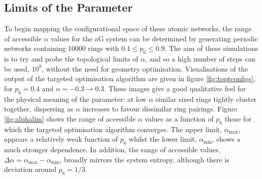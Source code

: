 \subsection{Limits of the \aw{} Parameter}

To begin mapping the configurational space of these atomic networks, the range of accessible $\alpha$ values for the aG system can be determined by generating periodic networks containing 10000 rings with $0.1\leq p_6 \leq 0.9$. 
The aim of these simulations is to try and probe the topological limits of $\alpha$, and so a high number of \mc{} steps can be used, $10^{9}$, without the need for geometry optimisation.
Visualisations of the output of the targeted optimisation algorithm are given in figure \ref{fig:toptconfigs}, for $p_6=0.4$ and $\alpha=-0.3\rightarrow 0.3$.
These images give a good qualitative feel for the physical meaning of the \aw{} parameter: at low $\alpha$ similar sized rings tightly cluster together, dispersing as $\alpha$ increases to favour dissimilar ring pairings.
Figure \ref{fig:alphalim} shows the range of accessible $\alpha$ values
as a function of $p_6$ \ie{} those for which the targeted optimisation algorithm converges.
The upper limit, $\alpha_{\mathrm{max}}$, appears a relatively weak function of $p_6$ whilst the lower limit, $\alpha_{\mathrm{min}}$, shows a much
stronger dependence.
In addition, the range of accessible values, $\Delta\alpha=\alpha_{\mathrm{max}}-\alpha_{\mathrm{min}}$, broadly mirrors the system entropy, although there is deviation around $p_6=1/3$.

